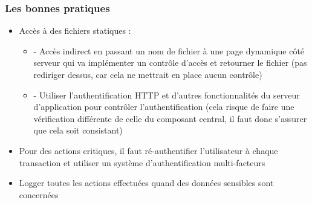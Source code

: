 \documentclass{beamer}
\begin{document}
\begin{frame}
  \frametitle{Les bonnes pratiques}
  \begin{exampleblock}{}
    \begin{itemize}
      \item Accès à des fichiers statiques : 
      \begin{itemize}
        \item - Accès indirect en passant un nom de fichier à une page dynamique côté serveur qui va implémenter un contrôle d'accès et retourner le fichier (pas rediriger dessus, car cela ne mettrait en place aucun contrôle)
        \item - Utiliser l'authentification HTTP et d'autres fonctionnalités du serveur d'application pour contrôler l'authentification (cela risque de faire une vérification différente de celle du composant central, il faut donc s'assurer que cela soit consistant)
      \end{itemize}
    \end{itemize}
  \end{exampleblock}
  
  \begin{alertblock}{}
    \begin{itemize}
      \item Pour des actions critiques, il faut ré-authentifier l'utilisateur à chaque transaction et utiliser un système d'authentification multi-facteurs
    \end{itemize}
  \end{alertblock}
  \begin{exampleblock}{}
    \begin{itemize}
      \item Logger toutes les actions effectuées quand des données sensibles sont concernées
    \end{itemize}
  \end{exampleblock}
\end{frame}
\end{document}
